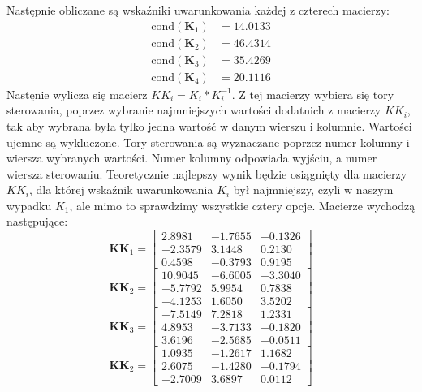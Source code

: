 Następnie obliczane są wskaźniki uwarunkowania każdej z czterech macierzy:
\begin{align}
  \text{cond}(\bm{K}_1) &= 14.0133 \\
  \text{cond}(\bm{K}_2) &= 46.4314 \\
  \text{cond}(\bm{K}_3) &= 35.4269 \\
  \text{cond}(\bm{K}_4) &= 20.1116
\end{align}
Nastęnie wylicza się macierz $KK_i = K_i * K_i^{-1}$. Z tej macierzy
wybiera się tory sterowania, poprzez wybranie najmniejszych wartości dodatnich
z macierzy $KK_i$, tak aby wybrana była tylko jedna wartość w danym wierszu i kolumnie.
Wartości ujemne są wykluczone. Tory sterowania są wyznaczane poprzez numer kolumny
i wiersza wybranych wartości. Numer kolumny odpowiada wyjściu, a numer wiersza sterowaniu.
Teoretycznie najlepszy wynik będzie osiągnięty dla
macierzy $KK_i$, dla której wskaźnik uwarunkowania $K_i$ był najmniejszy, czyli
w naszym wypadku $K_1$, ale mimo to sprawdzimy wszystkie cztery opcje. Macierze
wychodzą następujące:
\begin{equation}
  \bm{KK}_1 =
  \begin{bmatrix}
    2.8981  & -1.7655 &  -0.1326 \\
      -2.3579  &  3.1448   & 0.2130 \\
       0.4598 &  -0.3793   & 0.9195
  \end{bmatrix}
\end{equation}
\begin{equation}
  \bm{KK}_2 =
  \begin{bmatrix}
    10.9045 &  -6.6005  & -3.3040 \\
      -5.7792 &   5.9954   & 0.7838 \\
      -4.1253  &  1.6050   & 3.5202
  \end{bmatrix}
\end{equation}
\begin{equation}
  \bm{KK}_3 =
  \begin{bmatrix}
    -7.5149 &   7.2818 &   1.2331 \\
      4.8953   &-3.7133   &-0.1820 \\
      3.6196  & -2.5685  & -0.0511
  \end{bmatrix}
\end{equation}
\begin{equation}
  \bm{KK}_2 =
  \begin{bmatrix}
    1.0935  & -1.2617 &   1.1682 \\
     2.6075  & -1.4280 &  -0.1794 \\
    -2.7009 &   3.6897 &   0.0112
  \end{bmatrix}
\end{equation}
